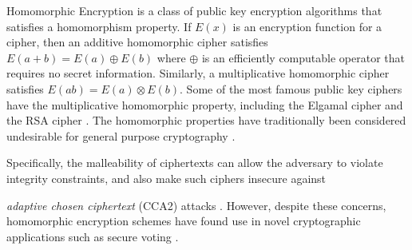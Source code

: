 Homomorphic Encryption is a class of public key encryption algorithms
that satisfies a homomorphism property. If $E(x)$ is an encryption
function for a cipher, then an additive homomorphic cipher satisfies
$E(a+b)=E(a)\oplus E(b)$ where $\oplus$ is an efficiently computable
operator that requires no secret information. Similarly, a multiplicative
homomorphic cipher satisfies $E(ab)=E(a)\otimes E(b)$. Some of the
most famous public key ciphers have the multiplicative homomorphic
property, including the Elgamal cipher \cite{elgamal85} and the RSA
cipher \cite{rivest83rsa}. The homomorphic properties have traditionally
been considered undesirable for general purpose cryptography \cite{jmsw02}.
%
\begin{comment}
mention Cramer-Shoup? 
\end{comment}
{}Specifically, the malleability of ciphertexts can allow the adversary
to violate integrity constraints, and also make such ciphers insecure
against %
\begin{comment}
because the homomorphic structure aids in cryptanalysis and allows
encrypted messages to be modified, violating integrity constraints.
\cite{jmsw02}. This leads to insecurity against 
\end{comment}
{}\emph{adaptive chosen ciphertext} (CCA2) attacks \cite{bleichenbacher98chosen}.
However, despite these concerns, homomorphic encryption schemes have
found use in novel cryptographic applications such as secure voting
\cite{benaloh94}. 

